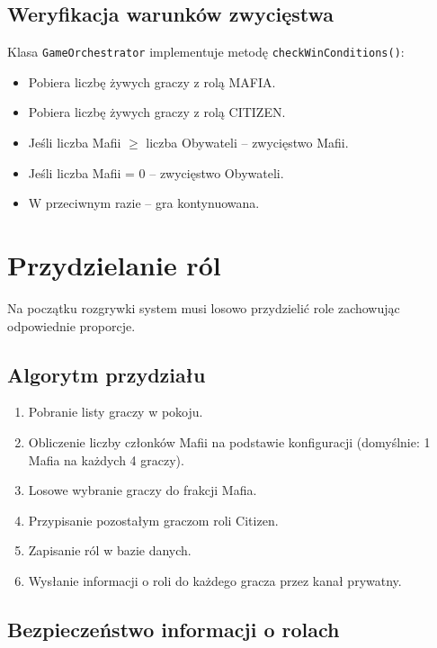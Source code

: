 ﻿\documentclass[a4paper,twoside,11pt]{mwrep}
\theoremstyle{plain} \newtheorem{thm}{Twierdzenie}
\theoremstyle{plain} \newtheorem{lem}{Lemat}
\theoremstyle{definition} \newtheorem{defn}{Definicja}
\theoremstyle{remark} \newtheorem*{rem}{Wniosek}
\begin{document}
\subsection{Weryfikacja warunków zwycięstwa}

Klasa \texttt{GameOrchestrator} implementuje metodę \texttt{checkWinConditions()}:

\begin{itemize}
    \item Pobiera liczbę żywych graczy z rolą MAFIA.
    \item Pobiera liczbę żywych graczy z rolą CITIZEN.
    \item Jeśli liczba Mafii $\geq$ liczba Obywateli -- zwycięstwo Mafii.
    \item Jeśli liczba Mafii = 0 -- zwycięstwo Obywateli.
    \item W przeciwnym razie -- gra kontynuowana.
\end{itemize}

\section{Przydzielanie ról}

Na początku rozgrywki system musi losowo przydzielić role zachowując odpowiednie proporcje.

\subsection{Algorytm przydziału}

\begin{enumerate}
    \item Pobranie listy graczy w pokoju.
    \item Obliczenie liczby członków Mafii na podstawie konfiguracji (domyślnie: 1 Mafia na każdych 4 graczy).
    \item Losowe wybranie graczy do frakcji Mafia.
    \item Przypisanie pozostałym graczom roli Citizen.
    \item Zapisanie ról w bazie danych.
    \item Wysłanie informacji o roli do każdego gracza przez kanał prywatny.
\end{enumerate}

\subsection{Bezpieczeństwo informacji o rolach}
\end{document}
